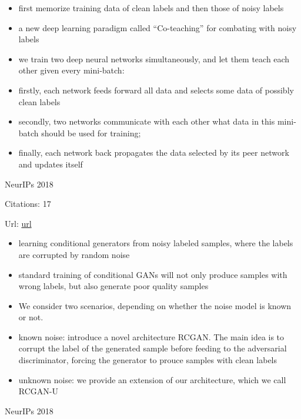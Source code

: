 \documentclass[11pt]{article}
\begin{document}
\begin{itemize}
\item first memorize training data of clean labels and then those of noisy labels
\item a new deep learning paradigm called “Co-teaching” for combating with noisy labels
\item we train two deep neural networks simultaneously, and let them teach each other given every mini-batch:
\item firstly, each network feeds forward all data and selects some data of possibly clean labels
\item  secondly, two networks communicate with each other what data in this mini-batch should be used for training;
\item finally, each network back propagates the data selected by its peer network and updates itself
\end{itemize}

\vspace{2cm}

\noindent NeurIPs 2018

\noindent Citations: 17

\noindent Url: \href{https://papers.nips.cc/paper/8229-robustness-of-conditional-gans-to-noisy-labels.pdf}{url}

\begin{itemize}
  \item learning conditional generators from noisy labeled samples, where the labels are corrupted by random noise
  \item standard training of conditional GANs will not only produce samples with wrong labels, but also generate poor quality samples
  \item We consider two scenarios, depending on whether the noise model is known or not.
  \item known noise: introduce a novel architecture RCGAN. The main idea is to corrupt the label of the generated sample before feeding to the adversarial discriminator, forcing the generator to prouce samples with clean labels
  \item unknown noise: we provide an extension of our architecture, which we call RCGAN-U
\end{itemize}

\vspace{2cm}

\noindent NeurIPs 2018
\end{document}
